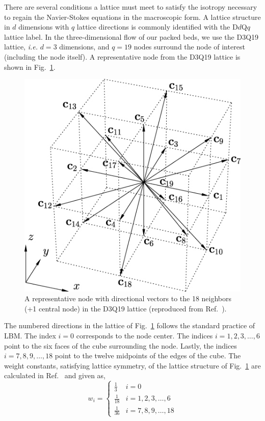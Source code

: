 There are several conditions a lattice must meet to satisfy the isotropy necessary to regain the Navier-Stokes equations in the macroscopic form.\cite{Viggen2009,Latt2007} A lattice structure in $d$ dimensions with $q$ lattice directions is commonly identified with the D$d$Q$q$ lattice label. In the three-dimensional flow of our packed beds, we use the D3Q19 lattice, \textit{i.e.} $d=3$ dimensions, and $q=19$ nodes surround the node of interest (including the node itself). A representative node from the D3Q19 lattice is shown in Fig.~\ref{fig:d3q19-lattice}.
\begin{figure}[t]
	\centering
	\includegraphics[width=\singleimagewidth]{chapters/figures/lbm/4193301.jpg}
	\caption{A representative node with directional vectors to the 18 neighbors (+1 central node) in the D3Q19 lattice (reproduced from Ref.~\cite{1742-5468-2010-01-P01018}).}\label{fig:d3q19-lattice}
\end{figure}

The numbered directions in the lattice of Fig.~\ref{fig:d3q19-lattice} follows the standard practice of LBM. The index $i=0$ corresponds to the node center. The indices $i = 1,2,3,\dots,6$ point to the six faces of the cube surrounding the node. Lastly, the indices $i=7,8,9,\dots,18$ point to the twelve midpoints of the edges of the cube. The weight constants, satisfying lattice symmetry, of the lattice structure of Fig.~\ref{fig:d3q19-lattice} are calculated in Ref.~\cite{Latt2007} and given as,
\begin{equation}\label{eq:d3q19-weights}
	w_i = \begin{cases}
	\frac{1}{3}			& i = 0\\
	\frac{1}{18} 		& i = 1,2,3,\dots,6\\
	\frac{1}{36}		& i = 7,8,9,\dots,18
	\end{cases}
\end{equation}

